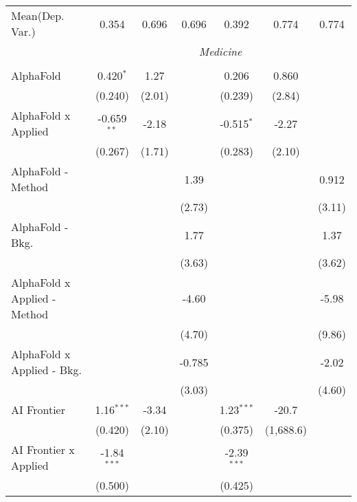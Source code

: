 \begin{tabular}{lcccccc}
Mean(Dep. Var.) & 0.354 & 0.696 & 0.696 & 0.392 & 0.774 & 0.774 \\
 & \multicolumn{6}{c}{\textit{Medicine}} \\ \\
   AlphaFold                    & 0.420$^{*}$   & 1.27    &         & 0.206         & 0.860      &   \\   
                                & (0.240)       & (2.01)  &         & (0.239)       & (2.84)     &   \\   
   AlphaFold x Applied          & -0.659$^{**}$ & -2.18   &         & -0.515$^{*}$  & -2.27      &   \\   
                                & (0.267)       & (1.71)  &         & (0.283)       & (2.10)     &   \\   
   AlphaFold - Method           &               &         & 1.39    &               &            & 0.912\\   
                                &               &         & (2.73)  &               &            & (3.11)\\   
   AlphaFold - Bkg.             &               &         & 1.77    &               &            & 1.37\\   
                                &               &         & (3.63)  &               &            & (3.62)\\   
   AlphaFold x Applied - Method &               &         & -4.60   &               &            & -5.98\\   
                                &               &         & (4.70)  &               &            & (9.86)\\   
   AlphaFold x Applied - Bkg.   &               &         & -0.785  &               &            & -2.02\\   
                                &               &         & (3.03)  &               &            & (4.60)\\   
   AI Frontier                  & 1.16$^{***}$  & -3.34   &         & 1.23$^{***}$  & -20.7      &   \\   
                                & (0.420)       & (2.10)  &         & (0.375)       & (1,688.6)  &   \\   
   AI Frontier x Applied        & -1.84$^{***}$ &         &         & -2.39$^{***}$ &            &   \\   
                                & (0.500)       &         &         & (0.425)       &            &   \\   

\end{tabular}

